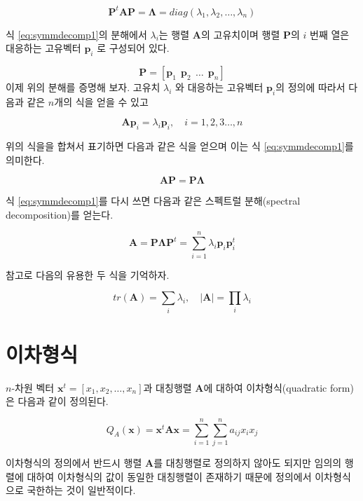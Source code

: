 \documentclass[
  10pt,
]{book}
\theoremstyle{definition}
\theoremstyle{definition}
\theoremstyle{definition}
\theoremstyle{definition}
\theoremstyle{remark}
\begin{document}
\begin{equation}
 \bm P^t \bm A \bm P = \bm \Lambda = diag(\lambda_1, \lambda_2, \dots, \lambda_n) 
 \label{eq:symmdecomp1}
\end{equation}

식 \eqref{eq:symmdecomp1}의 분해에서 \(\lambda_i\)는 행렬 \(\bm A\)의 고유치이며 행렬 \(\bm P\)의 \(i\) 번째 열은 대응하는 고유벡터 \(\bm p_i\) 로 구성되어 있다.

\[ \bm P = [ \bm p_1~~ \bm p_2 ~~ \dots ~~ \bm p_n ] \]
이제 위의 분해를 증명해 보자. 고유치 \(\lambda_i\) 와 대응하는 고유벡터 \(\bm p_i\)의 정의에 따라서 다음과 같은 \(n\)개의 식을 얻을 수 있고

\[ \bm A \bm p_i = \lambda_i \bm p_i , \quad i=1,2,3\dots, n \]

위의 식을을 합쳐서 표기하면 다음과 같은 식을 얻으며 이는 식 \eqref{eq:symmdecomp1}를 의미한다.

\[ \bm A \bm P = \bm P \bm \Lambda \]

식 \eqref{eq:symmdecomp1}를 다시 쓰면 다음과 같은 스펙트럴 분해(spectral decomposition)를 얻는다.

\begin{equation}
 \bm A  = \bm P \bm \Lambda \bm P^t  = \sum_{i=1}^n \lambda_i \bm p_i \bm {p}_i^t 
 \label{eq:spectral}
\end{equation}

참고로 다음의 유용한 두 식을 기억하자.

\[ tr(\bm A) = \sum_i \lambda_i ,\quad |\bm A| = \prod_i \lambda_i \]

\hypertarget{uxc774uxcc28uxd615uxc2dd}{%
\section{이차형식}\label{uxc774uxcc28uxd615uxc2dd}}

\(n\)-차원 벡터 \(\bm x^t=[x_1,x_2,\dots,x_n]\)과 대칭행렬 \(\bm A\)에 대하여 이차형식(quadratic form)은 다음과 같이 정의된다.

\begin{equation}
Q_A(\bm x) = \bm x^t \bm A \bm x =\sum_{i=1}^n \sum_{j=1}^n a_{ij} x_i x_j 
\label{eq:quadratic}
\end{equation}

이차형식의 정의에서 반드시 행렬 \(\bm A\)를 대칭행렬로 정의하지 않아도 되지만 임의의 행렬에 대하여 이차형식의 값이 동일한 대칭행렬이 존재하기 때문에 정의에서 이차형식으로 국한하는 것이 일반적이다.
\end{document}
